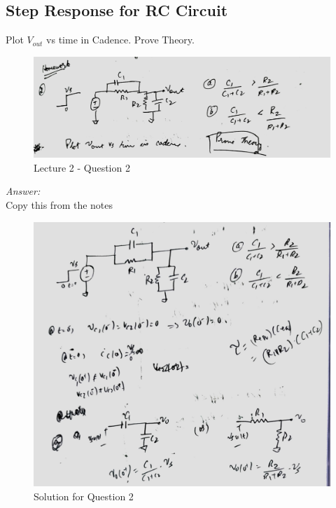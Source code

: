 \documentclass[a4paper]{article}
\begin{document}
\subsection{Step Response for RC Circuit}
Plot $V_{out}$ vs time in Cadence. Prove Theory. \\
\begin{figure}
    \centering
    \includegraphics[width=0.8\linewidth]{images/Lec_2_Q_2.jpeg}
    \caption{Lecture 2 - Question 2}
\end{figure}
\textit{Answer:}\\
Copy this from the notes\\
\begin{figure}
    \centering
    \includegraphics[width=1\linewidth]{images/Lec_2_Q2_Soln_Part_1.jpeg}
    \caption{Solution for Question 2}
\end{figure}
\end{document}
